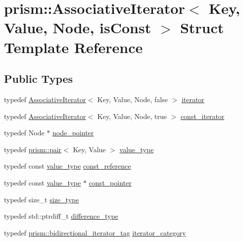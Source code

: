 \hypertarget{structprism_1_1_associative_iterator}{}\section{prism\+:\+:Associative\+Iterator$<$ Key, Value, Node, is\+Const $>$ Struct Template Reference}
\label{structprism_1_1_associative_iterator}
\subsection*{Public Types}
\begin{DoxyCompactItemize}
\item 
typedef \hyperlink{structprism_1_1_associative_iterator}{Associative\+Iterator}$<$ Key, Value, Node, false $>$ \hyperlink{structprism_1_1_associative_iterator_a1c18ef8b4a02324bfdbf541b023ecc6b}{iterator}
\item 
typedef \hyperlink{structprism_1_1_associative_iterator}{Associative\+Iterator}$<$ Key, Value, Node, true $>$ \hyperlink{structprism_1_1_associative_iterator_ab372de0dedeecc03d00f577af3380ef2}{const\+\_\+iterator}
\item 
typedef Node $\ast$ \hyperlink{structprism_1_1_associative_iterator_a73a0ddce41b285bf48fb0ef3411f6557}{node\+\_\+pointer}
\item 
typedef \hyperlink{structprism_1_1pair}{prism\+::pair}$<$ Key, Value $>$ \hyperlink{structprism_1_1_associative_iterator_a9708a3c0f7299fcdb2c668a3366b304a}{value\+\_\+type}
\item 
typedef const \hyperlink{structprism_1_1_associative_iterator_a9708a3c0f7299fcdb2c668a3366b304a}{value\+\_\+type} \hyperlink{structprism_1_1_associative_iterator_af94d581c385f29b0bf624dc03118132d}{const\+\_\+reference}
\item 
typedef const \hyperlink{structprism_1_1_associative_iterator_a9708a3c0f7299fcdb2c668a3366b304a}{value\+\_\+type} $\ast$ \hyperlink{structprism_1_1_associative_iterator_ae3b9ad6e27c4f13d0585adf4484e986a}{const\+\_\+pointer}
\item 
typedef size\+\_\+t \hyperlink{structprism_1_1_associative_iterator_af2e25b2482537eb7d89dbf497befd607}{size\+\_\+type}
\item 
typedef std\+::ptrdiff\+\_\+t \hyperlink{structprism_1_1_associative_iterator_a9ecd67af2f6f28f29ece181d452f162a}{difference\+\_\+type}
\item 
typedef \hyperlink{structprism_1_1bidirectional__iterator__tag}{prism\+::bidirectional\+\_\+iterator\+\_\+tag} \hyperlink{structprism_1_1_associative_iterator_ac502de0ddebd90f614e6de73ffbedde7}{iterator\+\_\+category}

\end{DoxyCompactItemize}
